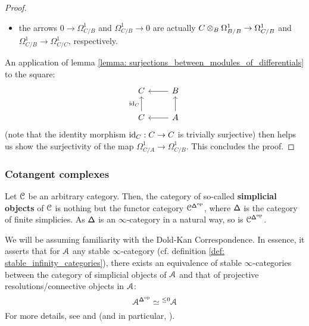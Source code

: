 \begin{proof}
\begin{itemize}
                                \item the arrows $0 \to \Omega^1_{C/B}$ and $\Omega^1_{C/B} \to 0$ are actually $C \tensor_B \Omega^1_{B/B} \to \Omega^1_{C/B}$ and $\Omega^1_{C/B} \to \Omega^1_{C/C}$, respectively.
                            \end{itemize}
                        An application of lemma \ref{lemma: surjections_between_modules_of_differentials} to the square:
                            $$
                                \begin{tikzcd}
                                	C & B \\
                                	C & A
                                	\arrow["{\id_C}", from=2-1, to=1-1]
                                	\arrow[from=2-2, to=1-2]
                                	\arrow[from=1-2, to=1-1]
                                	\arrow[from=2-2, to=2-1]
                                \end{tikzcd}
                            $$
                        (note that the identity morphism $\mathrm{id}_C: C \to C$ is trivially surjective) then helps us show the surjectivity of the map $\Omega^1_{C/A} \to \Omega^1_{C/B}$. This concludes the proof.
                    \end{proof}
                    
            \subsubsection{Cotangent complexes}
                \begin{convention}
                    Let $\mathcal{C}$ be an arbitrary category. Then, the category of so-called \textbf{simplicial objects} of $\mathcal{C}$ is nothing but the functor category $\mathcal{C}^{\mathsf{\Delta}^{\mathrm{op}}}$, where $\mathsf{\Delta}$ is the category of finite simplicies. As $\mathsf{\Delta}$ is an $\infty$-category in a natural way, so is $\mathcal{C}^{\mathsf{\Delta}^{\mathrm{op}}}$.
                \end{convention}
                
                \begin{remark}
                    We will be assuming familiarity with the Dold-Kan Correspondence. In essence, it asserts that for $\mathcal{A}$ any stable $\infty$-category (cf. definition \ref{def: stable_infinity_categories}), there exists an equivalence of stable $\infty$-categories between the category of simplicial objects of $\mathcal{A}$ and that of projective resolutions/connective objects in $\mathcal{A}$:
                        $$\mathcal{A}^{\mathsf{\Delta}^{\mathrm{op}}} \simeq {}^{\leq 0}\mathcal{A}$$
                    For more details, see \cite{nlab:dold-kan_correspondence} and \cite[Subsection 1.2.3]{HA} (and in particular, \cite[Theorem 1.2.3.7]{HA}).
                \end{remark}
                
